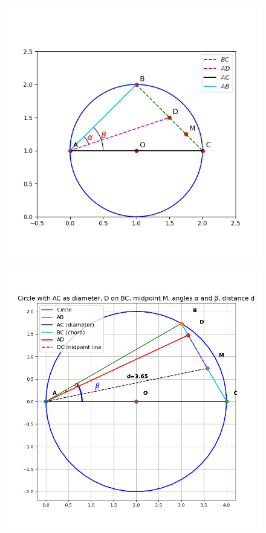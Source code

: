 \documentclass[journal]{IEEEtran}
\begin{document}
\begin{figure}[h]
    \centering
    \includegraphics[width=0.9\columnwidth]{figs/fig1.png}
    \caption{}
    \label{fig:placeholder}
\end{figure}
\begin{figure}
    \centering
    \includegraphics[width=0.9\columnwidth]{figs/fig2.png}
    \caption{}
    \label{fig:placeholder}
\end{figure}
\end{document}
